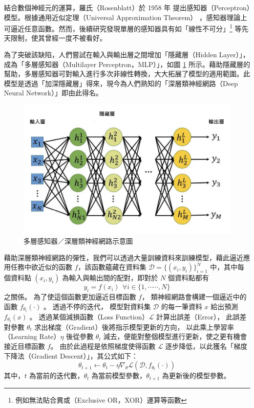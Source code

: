 結合數個神經元的運算，羅氏（Rosenblatt）於 1958 年 \cite{rosenblatt_perceptron_1958} 提出感知器（Perceptron）模型。根據通用近似定理（Universal Approximation Theorem）\cite{funahashi_approximate_1989} ，感知器理論上可逼近任意函數。然而，後續研究發現單層的感知器具有如「線性不可分」\footnote{例如無法貼合異或（Exclusive OR，XOR）運算等函數} 等先天限制，使其曾經一度不被看好。

為了突破該缺陷，人們嘗試在輸入與輸出層之間增加「隱藏層（Hidden Layer）」，成為「多層感知器（Multilayer Perceptron，MLP）」，如圖 \ref{fig:mlp} 所示。藉助隱藏層的幫助，多層感知器可對輸入進行多次非線性轉換，大大拓展了模型的適用範圍。此模型是透過「加深隱藏層」得來，現今為人們熟知的「深層類神經網路（Deep Neural Network）」即由此得名。

\begin{figure}
    \centering
    \includegraphics[width=0.8\linewidth]{figures/nnout.png}
    \caption{多層感知器／深層類神經網路示意圖}
    \label{fig:mlp}
\end{figure}


藉助深層類神經網路的彈性，我們可以透過⼤量訓練資料來訓練模型，藉此逼近應⽤任務中欲近似的函數 $f$，該函數蘊藏在資料集 $\mathcal{D} = \{(x_i, y_i)\}_{i=1}^N$ 中，其中每個資料點 $(x_i, y_i)$ 為輸入與輸出間的配對，即對於 $N$ 個資料點都有 $$y_i = f(x_i) \ \  \forall i \in \{1, \cdots\cdots, N\}$$之關係。
為了使這個函數更加逼近目標函數 $f$，
類神經網路會構建一個逼近中的函數 $f_{\theta_t}(\cdot)$ 。
透過不停的迭代，
模型對資料集 $\mathcal{D}$ 的每一筆資料 $x$ 給出預測 $f_{\theta_t}(x)$ 。
透過某個減損函數（Loss Function）$\mathcal{L}$ 計算出誤差（Error），
此誤差對參數 $\theta_t$ 求出梯度（Gradient）後將指示模型更新的方向，
以此乘上學習率（Learning Rate）$\eta$ 後從參數  $\theta_t$ 減去，便能對整個模型進行更新，使之更有機會接近目標函數 $f$。
由於此過程是依照梯度使得函數 $\mathcal{L}$ 逐步降低，以此獲名「梯度下降法（Gradient Descent）」，其公式如下：
$$\theta_{t+1} \leftarrow \theta_{t} - \eta \nabla_\theta\mathcal{L}(\mathcal{D}, f_{\theta_t}(\cdot))$$
其中，$t$ 為當前的迭代數，$\theta_t$ 為當前模型參數，$\theta_{t+1}$ 為更新後的模型參數。

